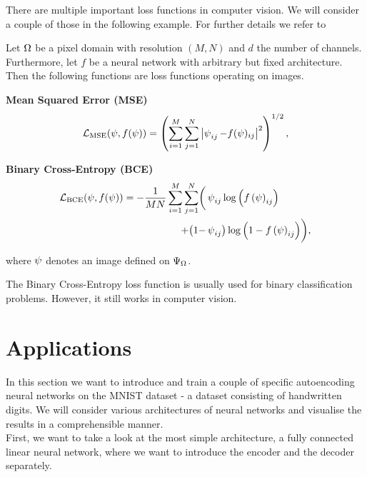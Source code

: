 There are multiple important loss functions in computer vision. We will consider a couple of those in the following example. For further details we refer to \cite{foster2022generative}


\begin{example}
Let $\Omega$ be a pixel domain with resolution $(M,N)$ and $d$ the number of channels. Furthermore, let $f$ be a neural network with arbitrary but fixed architecture. Then the following functions are loss functions operating on images.
\begin{mydescription}{}
\item[\textbf{Mean Squared Error (MSE)}] \begin{align*}
\operatorname{\operatorname{\mathcal{L}}_\text{MSE}}(\operatorname{\psi}, f(\operatorname{\psi})) = \left(\sum_{i=1}^{M}\sum_{j=1}^{N}\left|\operatorname{\psi}_{ij} - f(\operatorname{\psi})_{ij}\right|^2\right)^{1/2},
\end{align*}
\item[\textbf{Binary Cross-Entropy (BCE)}]
\begin{align*}
\operatorname{\operatorname{\mathcal{L}}_\text{BCE}}(\operatorname{\psi}, f(\operatorname{\psi})) = - \frac{1}{MN}\sum_{i=1}^{M}\sum_{j=1}^{N} \biggl(&\operatorname{\psi}_{ij} \log\left(f\left(\operatorname{\psi}\right)_{ij}\right)\\ + \bigl(1-&\operatorname{\psi}_{ij}\bigr)\log\left(1 - f\left(\operatorname{\psi}\right)_{ij}\right)\biggr),
\end{align*}
\end{mydescription}
where $\operatorname{\psi}$ denotes an image defined on $\Psi_{\Omega}$.
\end{example}


\begin{remark}
The Binary Cross-Entropy loss function is usually used for binary classification problems. However, it still works in computer vision.
\end{remark}


\section{Applications}\label{sec:ae_applications}

In this section we want to introduce and train a couple of specific autoencoding neural networks on the MNIST dataset - a dataset consisting of handwritten digits. We will consider various architectures of neural networks and visualise the results in a comprehensible manner.\\
First, we want to take a look at the most simple architecture, a fully connected linear neural network, where we want to introduce the encoder and the decoder separately.

